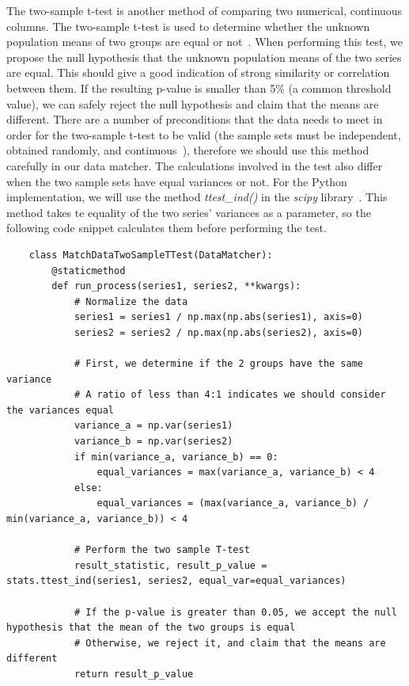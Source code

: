 The two-sample t-test is another method of comparing two numerical, continuous columns.
The two-sample t-test is used to determine whether the unknown population means of two groups are equal or not~\cite{twoSampleTTest}.
When performing this test, we propose the null hypothesis that the unknown population means of the two series are equal.
This should give a good indication of strong similarity or correlation between them.
If the resulting p-value is smaller than 5\% (a common threshold value), we can safely reject the null hypothesis and claim
that the means are different.
There are a number of preconditions that the data needs to meet in order for the two-sample t-test to be valid (the sample
sets must be independent, obtained randomly, and continuous~\cite{twoSampleTTest}), therefore we should use this method
carefully in our data matcher.
The calculations involved in the test also differ when the two sample sets have equal variances or not.
For the Python implementation, we will use the method \textit{ttest\_ind()} in the \textit{scipy} library~\cite{scipyTwoSampleTTestInd}.
This method takes te equality of the two series' variances as a parameter, so the following code snippet calculates them
before performing the test.

\begin{verbatim}
    class MatchDataTwoSampleTTest(DataMatcher):
        @staticmethod
        def run_process(series1, series2, **kwargs):
            # Normalize the data
            series1 = series1 / np.max(np.abs(series1), axis=0)
            series2 = series2 / np.max(np.abs(series2), axis=0)

            # First, we determine if the 2 groups have the same variance
            # A ratio of less than 4:1 indicates we should consider the variances equal
            variance_a = np.var(series1)
            variance_b = np.var(series2)
            if min(variance_a, variance_b) == 0:
                equal_variances = max(variance_a, variance_b) < 4
            else:
                equal_variances = (max(variance_a, variance_b) / min(variance_a, variance_b)) < 4

            # Perform the two sample T-test
            result_statistic, result_p_value = stats.ttest_ind(series1, series2, equal_var=equal_variances)

            # If the p-value is greater than 0.05, we accept the null hypothesis that the mean of the two groups is equal
            # Otherwise, we reject it, and claim that the means are different
            return result_p_value
\end{verbatim}

